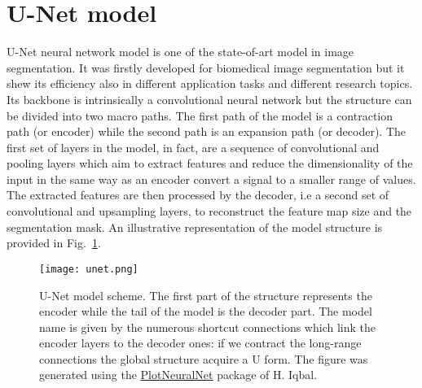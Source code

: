 \documentclass{standalone}
\begin{document}
\section[U-Net model]{U-Net model}\label{segmentation:Unet}

U-Net neural network model is one of the state-of-art model in image segmentation.
It was firstly developed for biomedical image segmentation but it shew its efficiency also in different application tasks and different research topics.
Its backbone is intrinsically a  convolutional neural network but the structure can be divided into two macro paths.
The first path of the model is a contraction path (or encoder) while the second path is an expansion path (or decoder).
The first set of layers in the model, in fact, are a sequence of convolutional and pooling layers which aim to extract features and reduce the dimensionality of the input in the same way as an encoder convert a signal to a smaller range of values.
The extracted features are then processed by the decoder, i.e a second set of convolutional and upsampling layers, to reconstruct the feature map size and the segmentation mask.
An illustrative representation of the model structure is provided in Fig.~\ref{fig:unet}.

\begin{center}
\begin{figure}[htbp]
\centering
\texttt{[image: unet.png]}
\caption{U-Net model scheme.
The first part of the structure represents the encoder while the tail of the model is the decoder part.
The model name is given by the numerous shortcut connections which link the encoder layers to the decoder ones: if we contract the long-range connections the global structure acquire a U form.
The figure was generated using the \href{https://github.com/HarisIqbal88/PlotNeuralNet}{PlotNeuralNet} package of H. Iqbal.
}
\label{fig:unet}
\end{figure}
\end{center}


\end{document}
